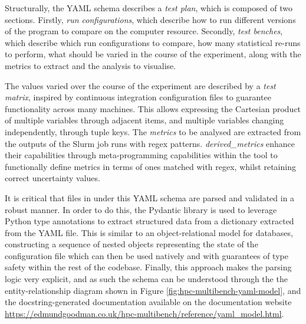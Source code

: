 Structurally, the YAML schema describes a \textit{test plan}, which is composed of two sections. Firstly, \textit{run configurations}, which describe how to run different versions of the program to compare on the computer resource. Secondly, \textit{test benches}, which describe which run configurations to compare, how many statistical re-runs to perform, what should be varied in the course of the experiment, along with the metrics to extract and the analysis to visualise.

The values varied over the course of the experiment are described by a \textit{test matrix}, inspired by continuous integration configuration files to guarantee functionality across many machines. This allows expressing the Cartesian product of multiple variables through adjacent items, and multiple variables changing independently, through tuple keys. The \textit{metrics} to be analysed are extracted from the outputs of the Slurm job runs with regex patterns. \textit{derived\_metrics} enhance their capabilities through  meta-programming capabilities within the tool to functionally define metrics in terms of ones matched with regex, whilst retaining correct uncertainty values.


It is critical that files in under this YAML schema are parsed and validated in a robust manner. In order to do this, the Pydantic library \cite{PydanticPydantic2024} is used to leverage Python type annotations to extract structured data from a dictionary extracted from the YAML file. This is similar to an object-relational model for databases, constructing a sequence of nested objects representing the state of the configuration file which can then be used natively and with guarantees of type safety within the rest of the codebase. Finally, this approach makes the parsing logic very explicit, and as such the schema can be understood through the the entity-relationship diagram shown in Figure \ref{fig:hpc-multibench-yaml-model}, and the docstring-generated documentation available on the documentation website \url{https://edmundgoodman.co.uk/hpc-multibench/reference/yaml_model.html}.

